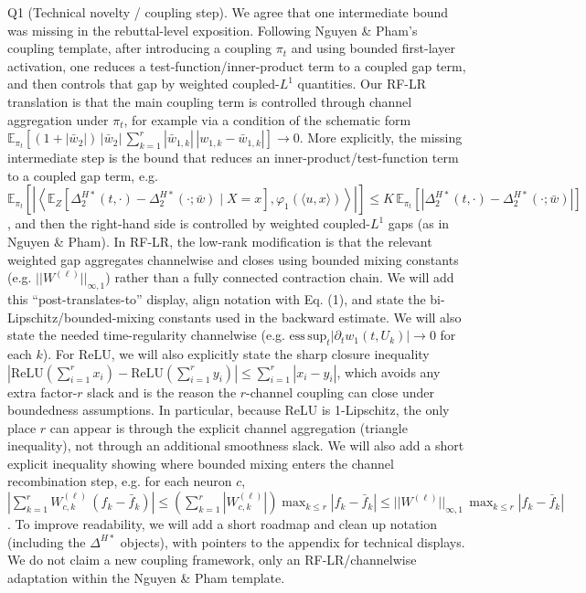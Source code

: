 Q1 (Technical novelty / coupling step). We agree that one intermediate bound was missing in the rebuttal-level exposition. Following Nguyen & Pham’s coupling template, after introducing a coupling $\pi_t$ and using bounded first-layer activation, one reduces a test-function/inner-product term to a coupled gap term, and then controls that gap by weighted coupled-$L^1$ quantities. Our RF-LR translation is that the main coupling term is controlled through channel aggregation under $\pi_t$, for example via a condition of the schematic form
$\mathbb E_{\pi_t}\!\left[(1+|\bar w_2|)\,|\bar w_2|\,\sum_{k=1}^{r} |\bar w_{1,k}|\,|w_{1,k}-\bar w_{1,k}|\right]\to 0$.
More explicitly, the missing intermediate step is the bound that reduces an inner-product/test-function term to a coupled gap term, e.g.
$\mathbb E_{\pi_t}\!\left[\left|\left\langle \mathbb E_Z\!\left[\Delta_{2}^{H*}(t,\cdot)-\Delta_{2}^{H*}(\cdot;\bar w)\mid X=x\right],\varphi_{1}(\langle u,x\rangle)\right\rangle\right|\right]\le
K\,\mathbb E_{\pi_t}\!\left[\left|\Delta_{2}^{H*}(t,\cdot)-\Delta_{2}^{H*}(\cdot;\bar w)\right|\right]$,
and then the right-hand side is controlled by weighted coupled-$L^1$ gaps (as in Nguyen & Pham). In RF-LR, the low-rank modification is that the relevant weighted gap aggregates channelwise and closes using bounded mixing constants (e.g. $||W^{(\ell)}||_{\infty,1}$) rather than a fully connected contraction chain. We will add this “post-translates-to” display, align notation with Eq. (1), and state the bi-Lipschitz/bounded-mixing constants used in the backward estimate.
We will also state the needed time-regularity channelwise (e.g. $\mathrm{ess\,sup}_t |\partial_t w_1(t,U_k)|\to 0$ for each $k$).
For ReLU, we will also explicitly state the sharp closure inequality
$|\mathrm{ReLU}(\sum_{i=1}^r x_i)-\mathrm{ReLU}(\sum_{i=1}^r y_i)|\le \sum_{i=1}^r |x_i-y_i|$,
which avoids any extra factor-$r$ slack and is the reason the $r$-channel coupling can close under boundedness assumptions. In particular, because ReLU is 1-Lipschitz, the only place $r$ can appear is through the explicit channel aggregation (triangle inequality), not through an additional smoothness slack.
We will also add a short explicit inequality showing where bounded mixing enters the channel recombination step, e.g. for each neuron $c$,
$\left|\sum_{k=1}^r W^{(\ell)}_{c,k}\,(f_k-\bar f_k)\right|\le \left(\sum_{k=1}^r |W^{(\ell)}_{c,k}|\right)\max_{k\le r}|f_k-\bar f_k|\le ||W^{(\ell)}||_{\infty,1}\,\max_{k\le r}|f_k-\bar f_k|$.
To improve readability, we will add a short roadmap and clean up notation (including the $\Delta^{H*}$ objects), with pointers to the appendix for technical displays. We do not claim a new coupling framework, only an RF-LR/channelwise adaptation within the Nguyen & Pham template.
    
